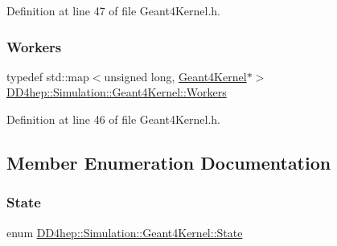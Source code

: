 Definition at line 47 of file Geant4\+Kernel.\+h.

\hypertarget{class_d_d4hep_1_1_simulation_1_1_geant4_kernel_ae9fdf26cda88a6f822f060558e85d797}{}\label{class_d_d4hep_1_1_simulation_1_1_geant4_kernel_ae9fdf26cda88a6f822f060558e85d797} 
\subsubsection{\texorpdfstring{Workers}{Workers}}
{\footnotesize\ttfamily typedef std\+::map$<$unsigned long, \hyperlink{class_d_d4hep_1_1_simulation_1_1_geant4_kernel}{Geant4\+Kernel}$\ast$$>$ \hyperlink{class_d_d4hep_1_1_simulation_1_1_geant4_kernel_ae9fdf26cda88a6f822f060558e85d797}{D\+D4hep\+::\+Simulation\+::\+Geant4\+Kernel\+::\+Workers}}



Definition at line 46 of file Geant4\+Kernel.\+h.



\subsection{Member Enumeration Documentation}
\hypertarget{class_d_d4hep_1_1_simulation_1_1_geant4_kernel_ab0de90f94bc8898e60c2ca6cef292d92}{}\label{class_d_d4hep_1_1_simulation_1_1_geant4_kernel_ab0de90f94bc8898e60c2ca6cef292d92} 
\subsubsection{\texorpdfstring{State}{State}}
{\footnotesize\ttfamily enum \hyperlink{class_d_d4hep_1_1_simulation_1_1_geant4_kernel_ab0de90f94bc8898e60c2ca6cef292d92}{D\+D4hep\+::\+Simulation\+::\+Geant4\+Kernel\+::\+State}}

